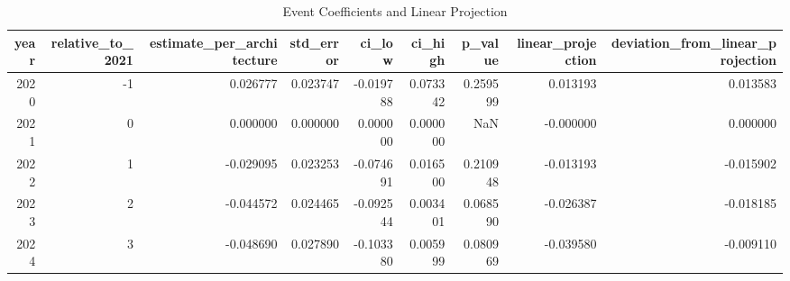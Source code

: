 \begin{table}
\caption{Event Coefficients and Linear Projection}
\label{tab:table2_event_linear_projection}
\begin{tabular}{rrrrrrrrr}
\toprule
year & relative_to_2021 & estimate_per_architecture & std_error & ci_low & ci_high & p_value & linear_projection & deviation_from_linear_projection \\
\midrule
2020 & -1 & 0.026777 & 0.023747 & -0.019788 & 0.073342 & 0.259599 & 0.013193 & 0.013583 \\
2021 & 0 & 0.000000 & 0.000000 & 0.000000 & 0.000000 & NaN & -0.000000 & 0.000000 \\
2022 & 1 & -0.029095 & 0.023253 & -0.074691 & 0.016500 & 0.210948 & -0.013193 & -0.015902 \\
2023 & 2 & -0.044572 & 0.024465 & -0.092544 & 0.003401 & 0.068590 & -0.026387 & -0.018185 \\
2024 & 3 & -0.048690 & 0.027890 & -0.103380 & 0.005999 & 0.080969 & -0.039580 & -0.009110 \\
\bottomrule
\end{tabular}
\end{table}
